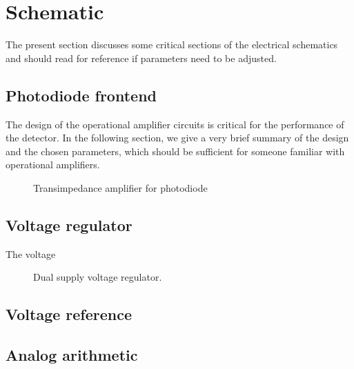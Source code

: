 \section{Schematic}

The present section discusses some critical sections of the electrical schematics and should read for reference if parameters need to be adjusted.

\subsection{Photodiode frontend}

The design of the operational amplifier circuits is critical for the performance of the detector.
In the following section, we give a very brief summary of the design and the chosen parameters, which should be sufficient for someone familiar with operational amplifiers.

\begin{figure}[H]
	\centering
	
 	\caption{Transimpedance amplifier for photodiode}\label{fig:transimpedance_amplifier}
\end{figure}

\subsection{Voltage regulator}

The voltage

\begin{figure}[H]
	\centering
	
	\caption{Dual supply voltage regulator.}\label{fig:voltage_regulator_dual}
\end{figure}

\subsection{Voltage reference}

\subsection{Analog arithmetic}
